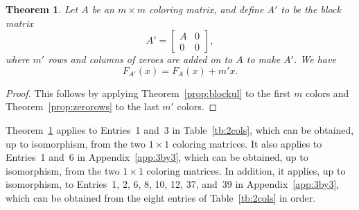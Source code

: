 \documentclass[12pt]{amsart}
\newtheorem{theorem}{Theorem}
\newcommand{\gfll}[1]{F_{#1}(x)}
\newcommand{\gfall}{\gfll{A}}
\begin{document}
\begin{theorem}\label{prop:unusablecolors}
    Let $A$ be an $m\times m$ coloring matrix, and define $A'$ to be the block matrix
    \[
    A'=\left[\begin{array}{c|c}A&0\\\hline0&0\end{array}\right],
    \]
    where $m'$ rows and columns of zeroes are added on to $A$ to make $A'$.
    We have
    \[
    \gfll{A'}=\gfall+m'x.
    \]
\end{theorem}
\begin{proof}
    This follows by applying Theorem~\ref{prop:blockul} to the first $m$ colors and Theorem~\ref{prop:zerorows} to the last $m'$ colors.
\end{proof}
Theorem~\ref{prop:unusablecolors} applies to Entries~1 and~3 in Table~\ref{tb:2cols}, which can be obtained, up to isomorphism, from the two $1\times1$ coloring matrices. It also applies to Entries~1 and~6 in Appendix~\ref{app:3by3}, which can be obtained, up to isomorphism, from the two $1\times 1$ coloring matrices. In addition, it applies, up to isomorphism, to Entries~1, 2, 6, 8, 10, 12, 37, and~39 in Appendix~\ref{app:3by3}, which can be obtained from the eight entries of Table~\ref{tb:2cols} in order.
\end{document}
